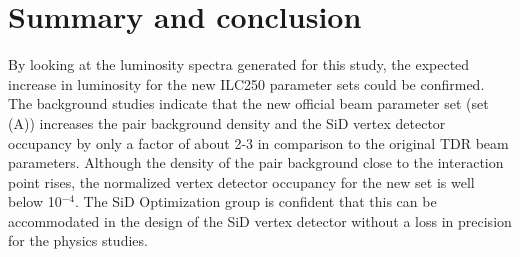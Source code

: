 \section{Summary and conclusion}
By looking at the luminosity spectra generated for this study, the expected increase in luminosity for the new ILC250 parameter sets could be confirmed.
The background studies indicate that the new official beam parameter set (set (A)) increases the \Pep\Pem pair background density and the SiD vertex detector occupancy by only a factor of about 2-3 in comparison to the original TDR beam parameters.
Although the density of the pair background close to the interaction point rises, the normalized vertex detector occupancy for the new set is well below 10$^{-4}$.
The SiD Optimization group is confident that this can be accommodated in the design of the SiD vertex detector without a loss in precision for the physics studies.
